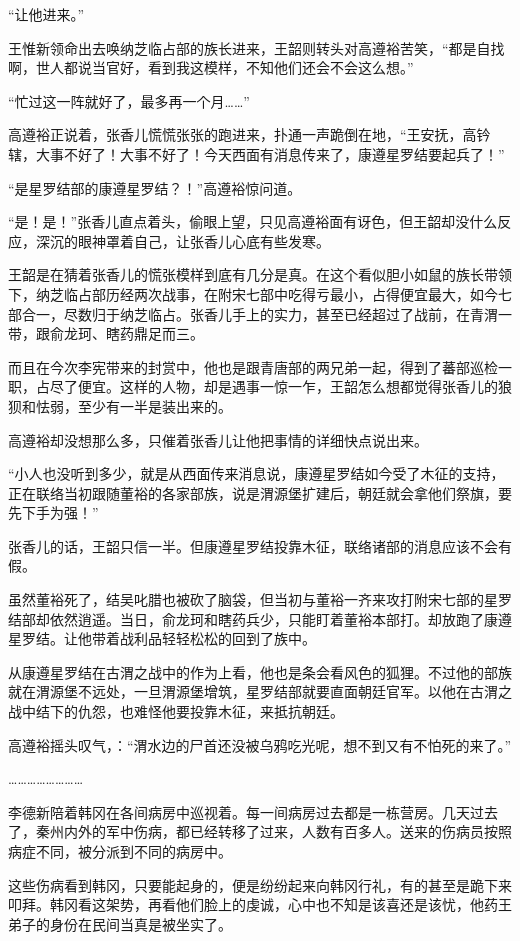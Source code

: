 “让他进来。”

王惟新领命出去唤纳芝临占部的族长进来，王韶则转头对高遵裕苦笑，“都是自找啊，世人都说当官好，看到我这模样，不知他们还会不会这么想。”

“忙过这一阵就好了，最多再一个月……”

高遵裕正说着，张香儿慌慌张张的跑进来，扑通一声跪倒在地，“王安抚，高钤辖，大事不好了！大事不好了！今天西面有消息传来了，康遵星罗结要起兵了！”

“是星罗结部的康遵星罗结？！”高遵裕惊问道。

“是！是！”张香儿直点着头，偷眼上望，只见高遵裕面有讶色，但王韶却没什么反应，深沉的眼神罩着自己，让张香儿心底有些发寒。

王韶是在猜着张香儿的慌张模样到底有几分是真。在这个看似胆小如鼠的族长带领下，纳芝临占部历经两次战事，在附宋七部中吃得亏最小，占得便宜最大，如今七部合一，尽数归于纳芝临占。张香儿手上的实力，甚至已经超过了战前，在青渭一带，跟俞龙珂、瞎药鼎足而三。

而且在今次李宪带来的封赏中，他也是跟青唐部的两兄弟一起，得到了蕃部巡检一职，占尽了便宜。这样的人物，却是遇事一惊一乍，王韶怎么想都觉得张香儿的狼狈和怯弱，至少有一半是装出来的。

高遵裕却没想那么多，只催着张香儿让他把事情的详细快点说出来。

“小人也没听到多少，就是从西面传来消息说，康遵星罗结如今受了木征的支持，正在联络当初跟随董裕的各家部族，说是渭源堡扩建后，朝廷就会拿他们祭旗，要先下手为强！”

张香儿的话，王韶只信一半。但康遵星罗结投靠木征，联络诸部的消息应该不会有假。

虽然董裕死了，结吴叱腊也被砍了脑袋，但当初与董裕一齐来攻打附宋七部的星罗结部却依然逍遥。当日，俞龙珂和瞎药兵少，只能盯着董裕本部打。却放跑了康遵星罗结。让他带着战利品轻轻松松的回到了族中。

从康遵星罗结在古渭之战中的作为上看，他也是条会看风色的狐狸。不过他的部族就在渭源堡不远处，一旦渭源堡增筑，星罗结部就要直面朝廷官军。以他在古渭之战中结下的仇怨，也难怪他要投靠木征，来抵抗朝廷。

高遵裕摇头叹气，：“渭水边的尸首还没被乌鸦吃光呢，想不到又有不怕死的来了。”

……………………

李德新陪着韩冈在各间病房中巡视着。每一间病房过去都是一栋营房。几天过去了，秦州内外的军中伤病，都已经转移了过来，人数有百多人。送来的伤病员按照病症不同，被分派到不同的病房中。

这些伤病看到韩冈，只要能起身的，便是纷纷起来向韩冈行礼，有的甚至是跪下来叩拜。韩冈看这架势，再看他们脸上的虔诚，心中也不知是该喜还是该忧，他药王弟子的身份在民间当真是被坐实了。

